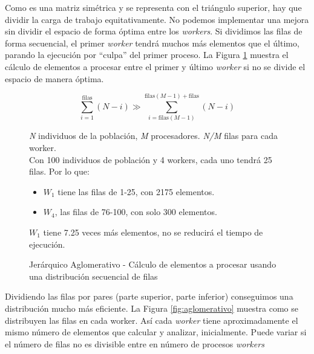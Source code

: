 				
		Como es una matriz simétrica y se representa con el triángulo superior, hay que dividir la carga de trabajo equitativamente. No podemos implementar una mejora sin dividir el espacio de forma óptima entre los \textit{workers}. Si dividimos las filas de forma secuencial, el primer \textit{worker} tendrá muchos más elementos que el último, parando la ejecución por ``culpa'' del primer proceso. La Figura \ref{fig:prueba} muestra el cálculo de elementos a procesar entre el primer y último \textit{worker} si no se divide el espacio de manera óptima. 
		
		
		
		\begin{figure}[!h]		
		\begin{mdframed}[roundcorner=5pt]
			\[
			\sum_{i=1}^{\text{filas}} (N - i) \gg \sum_{i=\text{filas}(M-1)}^{\text{filas}(M-1) + \text{filas}} (N - i)
			\]
			\begin{tcolorbox}[boxrule=0.5pt, fontupper=\small]
				
				\textit{N} individuos de la población, \textit{M} procesadores. \textit{N/M} filas para cada worker.\\
				
				Con 100 individuos de población y 4 workers, cada uno tendrá 25 filas. Por lo que:
				\begin{itemize}
					\item \(W_{1}\) tiene las filas de 1-25, con 2175 elementos. 
					\item \(W_{4}\), las filas de 76-100, con solo 300 elementos. 					
				\end{itemize}
				
				\(W_{1}\) tiene 7.25 veces más elementos, no se reducirá el tiempo de ejecución.
				
							
			\end{tcolorbox}
			
		\end{mdframed}
		
		\caption{Jerárquico Aglomerativo - Cálculo de elementos a procesar usando una distribución secuencial de filas}
		\label{fig:prueba}
		\end{figure}
		
		
		Dividiendo las filas por pares (parte superior, parte inferior) conseguimos una distribución mucho más eficiente. La Figura \ref{fig:aglomerativo} muestra como se distribuyen las filas en cada worker. Así cada \textit{worker} tiene aproximadamente el mismo número de elementos que calcular y analizar, inicialmente. Puede variar si el número de filas no es divisible entre en número de procesos \textit{workers} 
		
